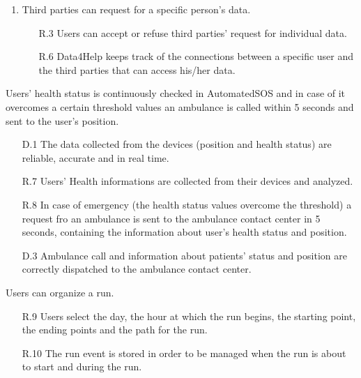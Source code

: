 \documentclass[a4paper]{article}
\begin{document}
\begin{enumerate}[label*={[G.\arabic*]}]
\begin{enumerate}[label*=.\arabic*]
\begin{enumerate}
	            \end{enumerate}
	        \item Third parties can request for a specific person's data.
	        
	            \begin{enumerate}
	                
	                \item [R.3] Users can accept or refuse third parties' request for individual data.
	                \item [R.6] Data4Help keeps track of the connections between a specific user and the third parties that can access his/her data.
	                
	            \end{enumerate}
	        
	    \end{enumerate}
	    
	\item Users' health status is continuously checked in AutomatedSOS and in case of it overcomes a certain threshold values an ambulance is called within 5 seconds and sent to the user's position.
	    \begin{enumerate}
	                
            \item [D.1] The data collected from the devices (position and health status) are reliable, accurate and in real time.
            \item [R.7] Users' Health informations are collected from their devices and analyzed.
            \item [R.8] In case of emergency (the health status values overcome the threshold) a request fro an ambulance is sent to the ambulance contact center in 5 seconds, containing the information about user's health status and position.
            \item [D.3] Ambulance call and information about patients' status and position are correctly dispatched to the ambulance contact center.
         
         \end{enumerate}
	
	\item Users can organize a run.
	    \begin{enumerate}
            
            \item [R.9] Users select the day, the hour at which the run begins, the starting point, the ending points and the path for the run.
            \item [R.10] The run event is stored in order to be managed when the run is about to start and during the run.
	                

\end{enumerate}
\end{enumerate}
\end{document}
